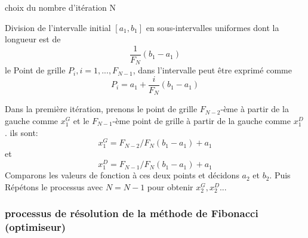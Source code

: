 \documentclass[a4paper,13pt]{article}
\begin{document}
\begin{list}{•}{ }

\item choix du nombre d'itération N
\item Division de l'intervalle initial $[a_{1}, b_{1}]$ en sous-intervalles uniformes dont la longueur est de  \[\frac{1}{F_{N}}(b_{1} - a_{1})\]
le Point de grille $P_{i}, i = 1,..., F_{N - 1}$, dans l'intervalle peut être exprimé comme \[P_{i} = a_{1} + \frac{i}{F_{N}}(b_{1} - a_{1})\]
\item Dans la première itération, prenons le point de grille $F_{N - 2}$-ème à partir de la gauche comme $x_{1}^{G}$ et le $F_{N - 1}$-ème point de grille à partir de la gauche comme $x_{1}^{D}$. ils sont:
\[x_{1}^{G} = F_{N - 2}/F_N(b_{1} - a_{1}) + a_{1}\]  et \[x_{1}^{D} = F_{N - 1}/F_N(b_{1} - a_{1}) + a_{1}\]
Comparons les valeurs de fonction à ces deux points et décidons $a_{2}$ et $b_{2}$. Puis Répétons le processus avec $N = N - 1$ pour obtenir $x_{2}^{G}, x_{2}^{D}$...
    
\end{list}

\subsubsection{processus de résolution de la méthode de Fibonacci (optimiseur)}
\end{document}
